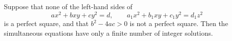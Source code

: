 \begin{proposition}
Suppose that none of the left-hand sides of
\[
    ax^2+bxy+cy^2=d,\qquad a_1x^2+b_1xy+c_1y^2=d_1z^2
\]
is a perfect square, and that $b^2-4ac>0$ is not a perfect square. Then the
simultaneous equations have only a finite number of integer solutions.
\end{proposition}
